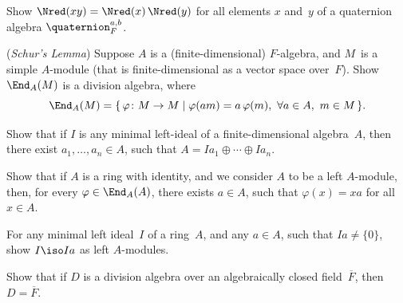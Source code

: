 \begin{exercises}

\item Show $\Nred(xy) = \Nred(x) \, \Nred(y)$ for all
elements $x$ and~$y$ of a quaternion algebra 
$\quaternion^{a,b}_F$.

\item \label{SchursLemma} 
(\emph{Schur's Lemma})
Suppose $A$ is a (finite-dimensional) $F$-algebra, and $M$~is a simple $A$-module (that is finite-dimensional as a vector space over~$F$). 
Show $\End_A(M)$ is a division algebra, where
	$$ \End_A(M) = \{\, \varphi \colon M \to M \mid \varphi(am) = a \, \varphi(m), \ \forall a \in A, \ m \in M \,\} .$$

\item \label{DirSumIdeals}
Show that if $I$ is any minimal left-ideal of a finite-dimensional algebra~$A$, then there exist $a_1,\ldots,a_n \in A$, such that $A = Ia_1 \oplus \cdots \oplus Ia_n$.

\item \label{End(A)=A}
Show that if $A$ is a ring with identity, and we consider $A$ to be a left $A$-module, then, for every $\varphi \in \End_A(A)$, there exists $a \in A$, such that $\varphi(x) = xa$ for all $x \in A$.

\item \label{Ia=I}
For any minimal left ideal~$I$ of a ring~$A$, and any $a \in A$, such that $Ia \neq \{0\}$, show $I \iso Ia$ as left $A$-modules.

\item \label{DivAlg/AlgClosed}
Show that if $D$ is a division algebra over an algebraically closed field~$\overline{F}$, then $D = \overline{F}$.


\end{exercises}
